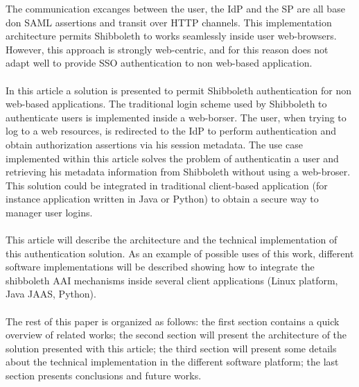 The communication excanges between the user, the IdP and the SP are all base don SAML assertions and transit over HTTP channels.
This implementation architecture permits Shibboleth to works seamlessly inside user web-browsers.
However, this approach is strongly web-centric, and for this reason does not adapt well to provide SSO authentication to non web-based
application.\\
\\
In this article a solution is presented to permit Shibboleth authentication for non web-based applications.
The traditional login scheme used by Shibboleth to authenticate users is implemented inside a web-borser.
The user, when trying to log to a web resources, is redirected to the IdP to perform authentication and obtain authorization assertions via
his session metadata.
The use case implemented within this article solves the problem of authenticatin a user and retrieving his metadata information from Shibboleth
without using a web-broser.
This solution could be integrated in traditional client-based application (for instance application written in Java or Python) to obtain
a secure way to manager user logins.\\
\\
This article will describe the architecture and the technical implementation of this authentication solution.
As an example of possible uses of this work, different software implementations will be described showing how to integrate the shibboleth AAI
mechanisms inside several client applications (Linux platform, Java JAAS, Python).\\
\\
The rest of this paper is organized as follows: the first section contains a quick overview of related works; the second section will present
the architecture of the solution presented with this article; the third section will present some details about the technical implementation
in the different software platform; the last section presents conclusions and future works.

\label{sec:relatedworks}
